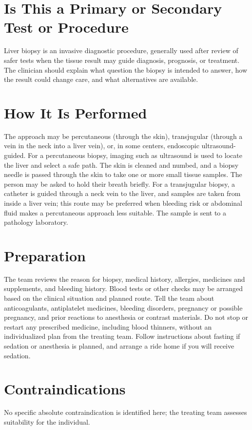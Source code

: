 \section*{Is This a Primary or Secondary Test or Procedure}
Liver biopsy is an invasive diagnostic procedure, generally used after review of safer tests when the tissue result may guide diagnosis, prognosis, or treatment. The clinician should explain what question the biopsy is intended to answer, how the result could change care, and what alternatives are available.

\section*{How It Is Performed}
The approach may be percutaneous (through the skin), transjugular (through a vein in the neck into a liver vein), or, in some centers, endoscopic ultrasound-guided. For a percutaneous biopsy, imaging such as ultrasound is used to locate the liver and select a safe path. The skin is cleaned and numbed, and a biopsy needle is passed through the skin to take one or more small tissue samples. The person may be asked to hold their breath briefly. For a transjugular biopsy, a catheter is guided through a neck vein to the liver, and samples are taken from inside a liver vein; this route may be preferred when bleeding risk or abdominal fluid makes a percutaneous approach less suitable. The sample is sent to a pathology laboratory.

\section*{Preparation}
The team reviews the reason for biopsy, medical history, allergies, medicines and supplements, and bleeding history. Blood tests or other checks may be arranged based on the clinical situation and planned route. Tell the team about anticoagulants, antiplatelet medicines, bleeding disorders, pregnancy or possible pregnancy, and prior reactions to anesthesia or contrast materials. Do not stop or restart any prescribed medicine, including blood thinners, without an individualized plan from the treating team. Follow instructions about fasting if sedation or anesthesia is planned, and arrange a ride home if you will receive sedation.

\section*{Contraindications}
No specific absolute contraindication is identified here; the treating team assesses suitability for the individual.

